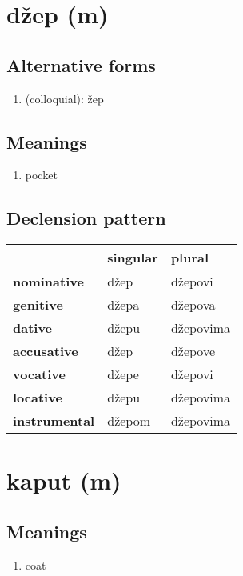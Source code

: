 \filbreak
\section{džep (m)}
\subsection*{Alternative forms}
\begin{enumerate}
\item (colloquial): žep
\end{enumerate}
\subsection*{Meanings}
\begin{enumerate}
\item pocket
\end{enumerate}
\subsection*{Declension pattern}
\begin{tabularx}{\linewidth}{Xll}
\toprule
{} & singular &     plural \\
\midrule
\textbf{nominative  } &     džep &    džepovi \\
\textbf{genitive    } &    džepa &    džepova \\
\textbf{dative      } &    džepu &  džepovima \\
\textbf{accusative  } &     džep &    džepove \\
\textbf{vocative    } &    džepe &    džepovi \\
\textbf{locative    } &    džepu &  džepovima \\
\textbf{instrumental} &   džepom &  džepovima \\
\bottomrule
\end{tabularx}

\filbreak
\section{kaput (m)}
\subsection*{Meanings}
\begin{enumerate}
\item coat
\end{enumerate}
